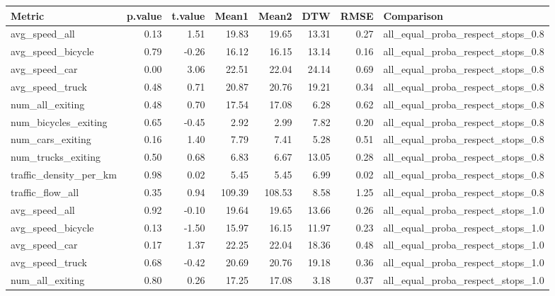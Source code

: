 \begin{table}[ht]
\centering
\begin{tabular}{lrrrrrrl}
  \hline
Metric & p.value & t.value & Mean1 & Mean2 & DTW & RMSE & Comparison \\ 
  \hline
avg\_speed\_all & 0.13 & 1.51 & 19.83 & 19.65 & 13.31 & 0.27 & all\_equal\_proba\_respect\_stops\_0.8 \\ 
  avg\_speed\_bicycle & 0.79 & -0.26 & 16.12 & 16.15 & 13.14 & 0.16 & all\_equal\_proba\_respect\_stops\_0.8 \\ 
  avg\_speed\_car & 0.00 & 3.06 & 22.51 & 22.04 & 24.14 & 0.69 & all\_equal\_proba\_respect\_stops\_0.8 \\ 
  avg\_speed\_truck & 0.48 & 0.71 & 20.87 & 20.76 & 19.21 & 0.34 & all\_equal\_proba\_respect\_stops\_0.8 \\ 
  num\_all\_exiting & 0.48 & 0.70 & 17.54 & 17.08 & 6.28 & 0.62 & all\_equal\_proba\_respect\_stops\_0.8 \\ 
  num\_bicycles\_exiting & 0.65 & -0.45 & 2.92 & 2.99 & 7.82 & 0.20 & all\_equal\_proba\_respect\_stops\_0.8 \\ 
  num\_cars\_exiting & 0.16 & 1.40 & 7.79 & 7.41 & 5.28 & 0.51 & all\_equal\_proba\_respect\_stops\_0.8 \\ 
  num\_trucks\_exiting & 0.50 & 0.68 & 6.83 & 6.67 & 13.05 & 0.28 & all\_equal\_proba\_respect\_stops\_0.8 \\ 
  traffic\_density\_per\_km & 0.98 & 0.02 & 5.45 & 5.45 & 6.99 & 0.02 & all\_equal\_proba\_respect\_stops\_0.8 \\ 
  traffic\_flow\_all & 0.35 & 0.94 & 109.39 & 108.53 & 8.58 & 1.25 & all\_equal\_proba\_respect\_stops\_0.8 \\ 
  avg\_speed\_all & 0.92 & -0.10 & 19.64 & 19.65 & 13.66 & 0.26 & all\_equal\_proba\_respect\_stops\_1.0 \\ 
  avg\_speed\_bicycle & 0.13 & -1.50 & 15.97 & 16.15 & 11.97 & 0.23 & all\_equal\_proba\_respect\_stops\_1.0 \\ 
  avg\_speed\_car & 0.17 & 1.37 & 22.25 & 22.04 & 18.36 & 0.48 & all\_equal\_proba\_respect\_stops\_1.0 \\ 
  avg\_speed\_truck & 0.68 & -0.42 & 20.69 & 20.76 & 19.18 & 0.36 & all\_equal\_proba\_respect\_stops\_1.0 \\ 
  num\_all\_exiting & 0.80 & 0.26 & 17.25 & 17.08 & 3.18 & 0.37 & all\_equal\_proba\_respect\_stops\_1.0 \\ 

\end{tabular}
\end{table}
